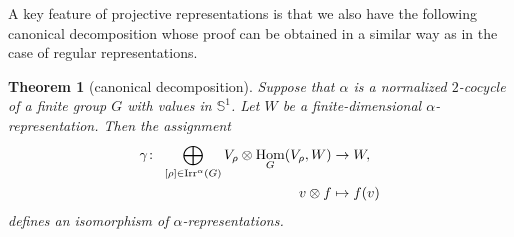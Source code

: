 \documentclass[10pt,a4paper]{amsart}
\def\S{\mathbb{S}}
\DeclareMathOperator{\Hom}{\textup{Hom}}
\DeclareMathOperator{\Irr}{\textup{Irr}}
\newtheorem{Th}{Theorem}[section]
\theoremstyle{definition}
\numberwithin{equation}{section}
\begin{document}
A key feature of projective representations is that we also have the following canonical
decomposition whose proof can be obtained in a similar way as in the case of regular
representations.

\begin{Th}[canonical decomposition]\label{can,decom}
Suppose that $\alpha$ is a
normalized $2$-cocycle of a finite group $G$ with values in $\S^{1}$. Let $W$ be a
finite-dimensional $\alpha$-representation. Then the assignment
\begin{align*}
\gamma\colon\ \bigoplus_{[\rho]\in \Irr^{\alpha}(G)}V_{\rho}\otimes \Hom_{G}(V_{\rho},W)
&\rightarrow W,
\\
v\otimes f&\mapsto f(v)
\end{align*}
defines an isomorphism of $\alpha$-representations.
\end{Th}
\end{document}
